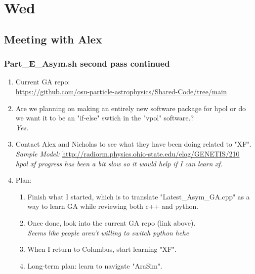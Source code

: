 \documentclass[12pt,letterpaper]{article}
\begin{document}
\section{Wed}
\subsection{Meeting with Alex}
\subsubsection{Part\_E\_Asym.sh second pass continued}
\begin{enumerate}
  \item Current GA repo:\\
    \url{https://github.com/osu-particle-astrophysics/Shared-Code/tree/main}
  \item Are we planning on making an entirely new software package for hpol or
    do we want it to be an "if-else" swtich in the "vpol" software.? \\
    \textit{Yes.}
  \item Contact Alex and Nicholas to see what they have been doing related to "XF".\\
    \textit{Sample Model:}
    \url{http://radiorm.physics.ohio-state.edu/elog/GENETIS/210}\\
    \textit{hpol xf progress has been a bit slow so it would help if I can learn xf.}
  \item Plan:
    \begin{enumerate}
      \item Finish what I started, which is to translate "Latest_Asym_GA.cpp" as a way
        to learn GA while reviewing both c++ and python.
      \item Once done, look into the current GA repo (link above).\\
        \textit{Seems like people aren't willing to switch python hehe}
      \item When I return to Columbus, start learning "XF".
      \item Long-term plan: learn to navigate "AraSim".
    \end{enumerate}
\end{enumerate}
\end{document}
